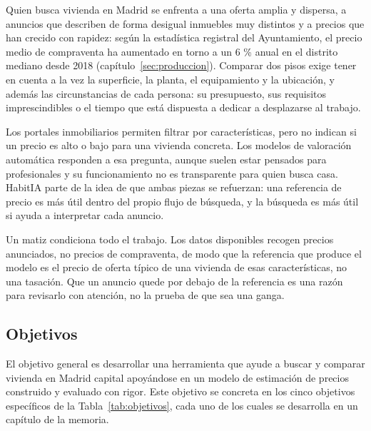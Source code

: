 \documentclass[11pt,a4paper]{article}
\begin{document}
Quien busca vivienda en Madrid se enfrenta a una oferta amplia y dispersa, a anuncios que describen de forma desigual inmuebles muy distintos y a precios que han crecido con rapidez: según la estadística registral del Ayuntamiento, el precio medio de compraventa ha aumentado en torno a un 6 \% anual en el distrito mediano desde 2018 (capítulo~\ref{sec:produccion}). Comparar dos pisos exige tener en cuenta a la vez la superficie, la planta, el equipamiento y la ubicación, y además las circunstancias de cada persona: su presupuesto, sus requisitos imprescindibles o el tiempo que está dispuesta a dedicar a desplazarse al trabajo.

Los portales inmobiliarios permiten filtrar por características, pero no indican si un precio es alto o bajo para una vivienda concreta. Los modelos de valoración automática responden a esa pregunta, aunque suelen estar pensados para profesionales y su funcionamiento no es transparente para quien busca casa. HabitIA parte de la idea de que ambas piezas se refuerzan: una referencia de precio es más útil dentro del propio flujo de búsqueda, y la búsqueda es más útil si ayuda a interpretar cada anuncio.

Un matiz condiciona todo el trabajo. Los datos disponibles recogen precios anunciados, no precios de compraventa, de modo que la referencia que produce el modelo es el precio de oferta típico de una vivienda de esas características, no una tasación. Que un anuncio quede por debajo de la referencia es una razón para revisarlo con atención, no la prueba de que sea una ganga.

\subsection{Objetivos}

El objetivo general es desarrollar una herramienta que ayude a buscar y comparar vivienda en Madrid capital apoyándose en un modelo de estimación de precios construido y evaluado con rigor. Este objetivo se concreta en los cinco objetivos específicos de la Tabla~\ref{tab:objetivos}, cada uno de los cuales se desarrolla en un capítulo de la memoria.
\end{document}
